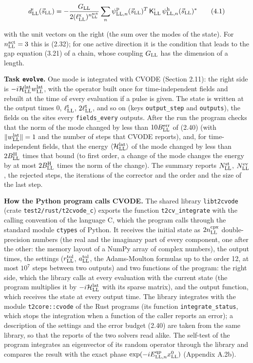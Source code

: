 \documentclass[
  10pt,
]{article}
\begin{document}
\[d^\iota_{\rm LL}(\vec s_{\rm LL})=-\frac{G_{\rm LL}}{2(\ell^{\rm x}_{\rm LL})^{n^{\rm act}_{\rm LL}}}\sum_n\psi^{\rm p}_{{\rm LL},n}(\vec s_{\rm LL})^T\,\mathsf K^\iota_{\rm LL}\,\psi^{\rm h}_{{\rm LL},n}(\vec s_{\rm LL})^*\tag{4.1}\]

with the unit vectors on the right (the sum over the modes of the
state). For \(n^{\rm act}_{\rm LL}=3\) this is (2.32); for one active
direction it is the condition that leads to the gap equation (3.21) of a
chain, whose coupling \(G_{\rm LL}\) has the dimension of a length.

\textbf{Task \texttt{evolve}.} One mode is integrated with CVODE
(Section 2.11): the right side is
\(-i\mathcal H^{\rm lat}_{\rm LL}w^{\rm lat}_{\rm LL}\), with the
operator built once for time-independent fields and rebuilt at the time
of every evaluation if a pulse is given. The state is written at the
output times \(0\), \(\ell^{\rm t}_{\rm LL}\),
\(2\ell^{\rm t}_{\rm LL}\), and so on (keys \texttt{output\_step} and
\texttt{outputs}), the fields on the sites every \texttt{fields\_every}
outputs. After the run the program checks that the norm of the mode
changed by less than \(10B^{\rm err}_{\rm LL}\) of (2.40) (with
\(\lVert w^{\rm lat}_{\rm LL}\rVert=1\) and the number of steps that
CVODE reports), and, for time-independent fields, that the energy
\(\langle\mathcal H^{\rm lat}_{\rm LL}\rangle\) of the mode changed by
less than \(2B^{\rm H}_{\rm LL}\) times that bound (to first order, a
change of the mode changes the energy by at most \(2B^{\rm H}_{\rm LL}\)
times the norm of the change). The summary reports
\(N^{\rm st}_{\rm LL}\), \(N^{\rm ev}_{\rm LL}\), the rejected steps,
the iterations of the corrector and the order and the size of the last
step.

\textbf{How the Python program calls CVODE.} The shared library
\texttt{libt2cvode} (crate \texttt{test2/rust/t2cvode\_c}) exports the
function \texttt{t2cv\_integrate} with the calling convention of the
language C, which the program calls through the standard module
\texttt{ctypes} of Python. It receives the initial state as
\(2n^{\rm cpx}_{\rm LL}\) double-precision numbers (the real and the
imaginary part of every component, one after the other: the memory
layout of a NumPy array of complex numbers), the output times, the
settings (\(r^{\rm tol}_{\rm LL}\), \(a^{\rm tol}_{\rm LL}\), the
Adams-Moulton formulas up to the order 12, at most \(10^7\) steps
between two outputs) and two functions of the program: the right side,
which the library calls at every evaluation with the current state (the
program multiplies it by \(-i\mathcal H^{\rm lat}_{\rm LL}\) with its
sparse matrix), and the output function, which receives the state at
every output time. The library integrates with the module
\texttt{t2core::cvode} of the Rust programs (its function
\texttt{integrate\_status}, which stops the integration when a function
of the caller reports an error); a description of the settings and the
error budget (2.40) are taken from the same library, so that the reports
of the two solvers read alike. The self-test of the program integrates
an eigenvector of its random operator through the library and compares
the result with the exact phase
\(\exp(-iE^{\rm qp}_{{\rm LL},n}x^0_{\rm LL})\) (Appendix A.2b).
\end{document}
